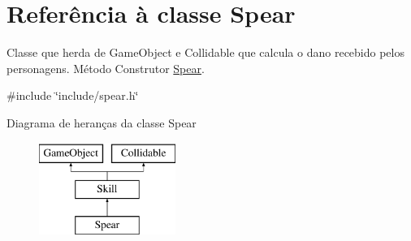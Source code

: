 \hypertarget{classSpear}{}\section{Referência à classe Spear}
\label{classSpear}


Classe que herda de Game\+Object e Collidable que calcula o dano recebido pelos personagens.  Método Construtor \mbox{\hyperlink{classSpear}{Spear}}.  




{\ttfamily \#include \char`\"{}include/spear.\+h\char`\"{}}

Diagrama de heranças da classe Spear\begin{figure}[H]
\begin{center}
\leavevmode
\includegraphics[height=3.000000cm]{classSpear}
\end{center}
\end{figure}
